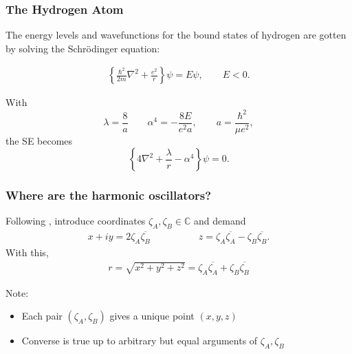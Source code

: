 \documentclass{beamer}
\theoremstyle{definition}
\newcommand{\lc}{\left\{}
\newcommand{\rc}{\right\}}
\newcommand{\f}[2]{\frac{#1}{#2}}
\newcommand{\al}{\alpha}
\begin{document}
\begin{frame}
	\frametitle{The Hydrogen Atom}
	
	The energy levels and wavefunctions for the bound states of hydrogen are gotten by solving the Schr\"{o}dinger equation:
	
	\begin{align*}
	\lc \f{\hbar^2 }{2m} \nabla^2 + \f{e^2}{r} \rc \psi = E\psi, \quad\quad E < 0.
	\end{align*}
	
	\pause
	
	With
	\begin{equation}
	\label{eq:conds}
	\lambda = \f{8}{a} \quad\quad \al^4 = -\f{8E}{e^2 a}, \quad\quad a = \f{\hbar^2}{\mu e^2},
	\end{equation}
	the SE becomes
	\begin{equation}\label{eq:SE}
	\lc 4\nabla^2 + \f{\lambda}{r} -\al^4  \rc \psi = 0.
	\end{equation}
	
\end{frame}


\begin{frame}
	\frametitle{Where are the harmonic oscillators? }
	
	Following \cite{cornish1984hydrogen}, introduce coordinates $\zeta_A, \zeta_B \in \mathbb{C}$ and demand
	\begin{align*}
	x + iy = 2 \zeta_A  \overline{\zeta_B} 
	\quad\quad\quad\quad\quad   
	z = \zeta_A \overline{\zeta_A}  -  \zeta_B \overline{\zeta_B}  .
	\end{align*}
	\pause
	With this,
	\begin{align*}
	r = \sqrt{x^2 + y^2 + z^2} = \zeta_A \overline{\zeta_A}  +  \zeta_B \overline{\zeta_B} 
	\end{align*}
	
	Note:
	\begin{itemize}
	\item Each pair $(\zeta_A, \zeta_B)$ gives a unique point $(x,y,z)$
	
	\item Converse is true up to arbitrary but equal arguments of $\zeta_A, \zeta_B$
	\end{itemize}
	
\end{frame}
\end{document}
